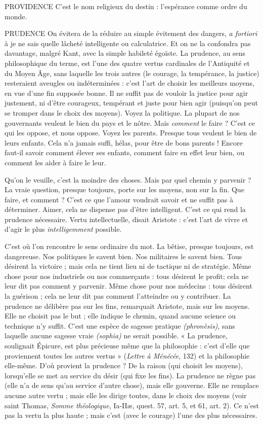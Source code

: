 PROVIDENCE C'est le nom religieux du destin : l’espérance comme ordre
du monde.

PRUDENCE On évitera de la réduire au simple évitement des dangers,
{\it a fortiori} à je ne sais quelle lâcheté intelligente ou calculatrice.
Et on ne la confondra pas davantage, malgré Kant, avec la simple habileté
égoïste. La prudence, au sens philosophique du terme, est l’une des quatre
vertus cardinales de l'Antiquité et du Moyen Âge, sans laquelle les trois autres
(le courage, la tempérance, la justice) resteraient aveugles ou indéterminées :
c’est l’art de choisir les meilleurs moyens, en vue d’une fin supposée bonne. Il
ne suffit pas de vouloir la justice pour agir justement, ni d’être courageux, tempérant
et juste pour bien agir (puisqu'on peut se tromper dans le choix des
moyens). Voyez la politique. La plupart de nos gouvernants veulent le bien du
pays et le nôtre. Mais {\it comment} le faire ? C’est ce qui les oppose, et nous oppose.
Voyez les parents. Presque tous veulent le bien de leurs enfants. Cela n’a jamais
suffi, hélas, pour être de bons parents ! Encore faut-il savoir comment élever ses
enfants, comment faire en effet leur bien, ou comment les aider à faire le leur.

Qu’on le veuille, c’est la moindre des choses. Mais par quel chemin y parvenir ?
La vraie question, presque toujours, porte sur les moyens, non sur la fin. Que
faire, et comment ? C’est ce que l’amour voudrait savoir et ne suffit pas à déterminer.
Aimer, cela ne dispense pas d’être intelligent. C’est ce qui rend la prudence
nécessaire. Vertu intellectuelle, disait Aristote : c’est l’art de vivre et
d’agir le plus {\it intelligemment} possible.

C’est où l’on rencontre le sens ordinaire du mot. La bêtise, presque toujours,
est dangereuse. Nos politiques le savent bien. Nos militaires le savent
bien. Tous désirent la victoire ; mais cela ne tient lieu ni de tactique ni de stratégie.
Même chose pour nos industriels ou nos commerçants : tous désirent le
profit; cela ne leur dit pas comment y parvenir. Même chose pour nos
médecins : tous désirent la guérison ; cela ne leur dit pas comment l’atteindre
ou y contribuer. La prudence ne délibère pas sur les fins, remarquait Aristote,
mais sur les moyens. Elle ne choisit pas le but ; elle indique le chemin, quand
aucune science ou technique n’y suffit. C’est une espèce de sagesse pratique
{\it (phronèsis)}, sans laquelle aucune sagesse vraie {\it (sophia)} ne serait possible. « La
prudence, soulignait Épicure, est plus précieuse même que la philosophie : c’est
d’elle que proviennent toutes les autres vertus » ({\it Lettre à Ménécée}, 132) et la
philosophie elle-même. D’où provient la prudence ? De la raison (qui choisit
les moyens), lorsqu'elle se met au service du désir (qui fixe les fins). La prudence
ne règne pas (elle n’a de sens qu’au service d’autre chose), mais elle gouverne.
Elle ne remplace aucune autre vertu ; mais elle les dirige toutes, dans le
choix des moyens (voir saint Thomas, {\it Somme théologique}, Ia-IIæ, quest. 57,
art. 5, et 61, art. 2). Ce n’est pas la vertu la plus haute ; mais c’est (avec le courage)
l’une des plus nécessaires.

